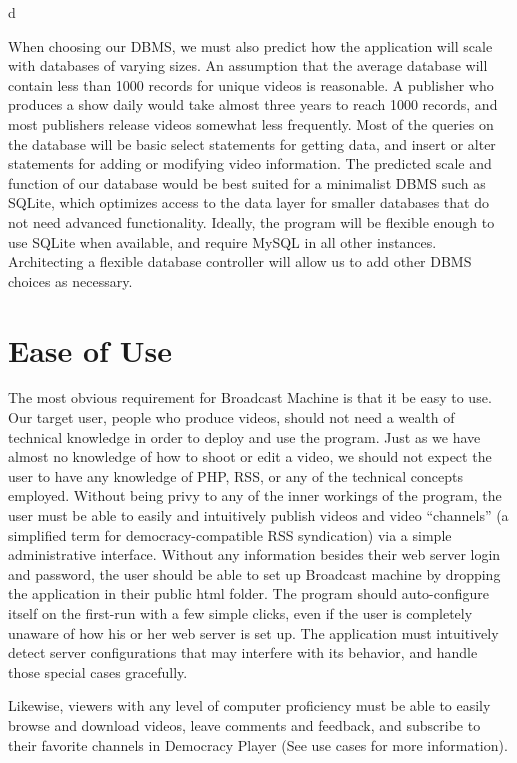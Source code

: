 d\documentclass[a4paper,12pt]{report}
\begin{document}
{{When choosing our DBMS, we must also predict how the application will scale with databases of varying sizes. 
An assumption that the average database will contain less than 1000 records for unique videos is reasonable. A publisher who produces a show daily would take almost three years to reach 1000 records, and most publishers release videos somewhat less frequently. 
Most of the queries on the database will be basic select statements for getting data, and insert or alter statements for adding or modifying video information. 
The predicted scale and function of our database would be best suited for a minimalist DBMS such as SQLite, which optimizes access to the data layer for smaller databases that do not need advanced functionality. 
Ideally, the program will be flexible enough to use SQLite when available, and require MySQL in all other instances. 
Architecting a flexible database controller will allow us to add other DBMS choices as necessary.

\section{Ease of Use}

	The most obvious requirement for Broadcast Machine is that it be easy to use. 
Our target user, people who produce videos, should not need a wealth of technical knowledge in order to deploy and use the program. 
Just as we have almost no knowledge of how to shoot or edit a video, we should not expect the user to have any knowledge of PHP, RSS, or any of the technical concepts employed. 
Without being privy to any of the inner workings of the program, the user must be able to easily and intuitively publish videos and video “channels” (a simplified term for democracy-compatible RSS syndication) via a simple administrative interface. 
Without any information besides their web server login and password, the user should be able to set up Broadcast machine by dropping the application in their public html folder. 
The program should auto-configure itself on the first-run with a few simple clicks, even if the user is completely unaware of how his or her web server is set up. 
The application must intuitively detect server configurations that may interfere with its behavior, and handle those special cases gracefully.

Likewise, viewers with any level of computer proficiency must be able to easily browse and download videos, leave comments and feedback, and subscribe to their favorite channels in Democracy Player (See use cases for more information).

}}
\end{document}
